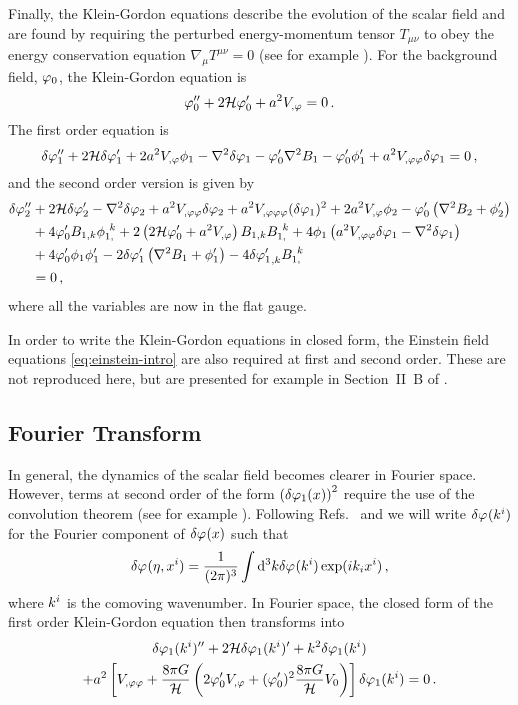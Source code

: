 Finally, the Klein-Gordon equations describe the evolution of the scalar field and
are
found by requiring the perturbed energy-momentum tensor $T_{\mu\nu}$ to obey the
energy conservation equation $\nabla_\mu T^{\mu\nu}=0$ (see for example
). For the
background field, $\varphi_0$, the Klein-Gordon equation is 
%
\begin{equation}
\label{eq:KGback-num}
\varphi_{0}''+2\mathcal{H}\varphi_{0}'+a^2 V_{,\varphi} = 0\,.   
\end{equation}
%
% 
% 
The first order equation is
%
\begin{equation}
\label{eq:KGflatsingle-num}
\delta\varphi_{1}''+2\mathcal{H}\delta\varphi_{1}'+2a^2 V_{,\varphi} \phi_1
-\nabla^2\delta\varphi_{1}-\varphi_{0}'\nabla^2 B_1
-\varphi_{0}'\phi'_1 + a^2 V_{,\varphi\varphi} \delta\varphi_{1}
=0\,,
\end{equation}
%
and the second order version is given by
%
\begin{align}
\label{eq:KG2flatsingle-num}
\dvp2'' &+ 2\H\dvp2'-\nabla^2\dvp2+a^2 \Upp \dvp2
+ a^2 \Uppp (\dvp1)^2 +2a^2 \Uphi \phi_2
-\vp_{0}'\left(\nabla^2 B_2+\phi_2'\right)\nonumber\\
%
&+ 4\vp_{0}' B_{1,k}\phi_{1,}^{~k}
+2\left(2\H\vp_{0}'+a^2 \Uphi\right) B_{1,k}B_{1,}^{~k}
+4\phi_1\left(a^2 \Upp \dvp1-\nabla^2\dvp1\right) \nonumber\\
&+ 4\vp_{0}'\phi_1\phi_1'
-2\dvp1'\left(\nabla^2 B_1+\phi_1'\right)-4{\dvp1'}_{,k}B_{1,}^{~k} \nonumber \\
&= 0\,,
\end{align}
% 
where all the variables are now in the flat gauge.


In order to write the Klein-Gordon equations in closed form, the Einstein field
equations \eqref{eq:einstein-intro} are also required at first and second order.
These are not reproduced here, but are presented for example in Section~II~B of
. 

\subsection{Fourier Transform}
\label{sec:fourier-perts}
% 
In general, the dynamics of the scalar field becomes clearer in Fourier space.
However, terms at second order of the form
$\left(\delta\varphi_{1}(x)\right)^2$ require the use
of the convolution theorem (see for example ).
Following Refs.~\cite{book:liddle} and \cite{Malik:2006ir} we will write
$\delta\varphi_{}(k^i)$
for the Fourier component of $\delta\varphi_{}(x)$ such that
% 
\begin{equation}
 \delta\varphi_{}(\eta, x^i) = \frac{1}{(2 \pi)^3} \int \mathrm{d}^3k \delta\varphi_{}(k^i) \exp (i k_i
x^i)
\,,
\end{equation}
% 
where $k^i$ is the comoving wavenumber.
In Fourier space, the closed form of the first order Klein-Gordon equation then
transforms into
%
\begin{multline}
\label{eq:fokg}
 \delta\varphi_{1}(k^i)'' + 2\mathcal{H} \delta\varphi_{1}(k^i)' + k^2\delta\varphi_{1}(k^i) \\
+ a^2 \left[V_{,\varphi\varphi} +
\frac{8\pi G}{\mathcal{H}}\left(2\varphi_{0}' V_{,\varphi} + (\varphi_{0}')^2\frac{8\pi G
}{\mathcal{H}}V_{0}\right)\right]\delta\varphi_{1}(k^i) = 0 \,.
\end{multline}
%


